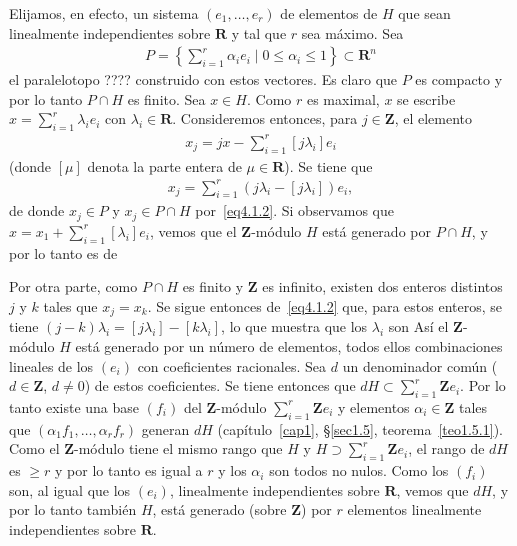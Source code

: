 \documentclass[bibtotoc,leqno,spanish]{amsbook}
\let\emph\relax %
\newcommand{\RR}{\mathbf{R}}
\newcommand{\ZZ}{\mathbf{Z}}
\numberwithin{equation}{section}
\theoremstyle{note}
\theoremstyle{note}
\theoremstyle{rem}
\numberwithin{theorem}{section}
\numberwithin{proposition}{section}
\numberwithin{definition}{section}
\numberwithin{lemma}{section}
\numberwithin{corollary}{section}
\numberwithin{example}{section}
\numberwithin{footnote}{section}%
\begin{document}
Elijamos, en efecto, un sistema $(e_{1},\dots,e_{r})$ de elementos de $H$ que sean linealmente independientes
sobre $\RR$ y tal que $r$ sea m\'aximo. Sea
\begin{gather}
P = \left\{\sum_{i=1}^{r}\alpha_{i}e_{i}\mid 0\leq\alpha_{i}\leq 1\right\}\subset\RR^{n}
\end{gather}
el paralelotopo ???? construido con estos vectores. Es claro que $P$ es compacto y por lo tanto
$P\cap H$ es finito. Sea $x\in H$. Como $r$ es maximal, $x$ se escribe $x = \sum_{i=1}^{r}\lambda_{i}e_{i}$
con $\lambda_{i}\in\RR$. Consideremos entonces, para $j\in\ZZ$, el elemento
\begin{gather}\label{eq4.1.2}
x_{j} = jx-\sum_{i=1}^{r}[j\lambda_{i}]e_{i}
\end{gather}
(donde $[\mu]$ denota la parte entera de $\mu\in\RR$). Se tiene que
\begin{gather*}
x_{j} = \sum_{i=1}^{r}(j\lambda_{i}-[j\lambda_{i}])e_{i},
\end{gather*}
de donde $x_{j}\in P$ y $x_{j}\in P\cap H$ por~\eqref{eq4.1.2}. Si observamos que $x = x_{1}+\sum_{i=1}^{r}[\lambda_{i}]e_{i}$,
vemos que el $\ZZ$-m\'odulo $H$ est\'a generado por $P\cap H$, y por lo tanto es de \emph{tipo finito.}

Por otra parte, como $P\cap H$ es finito y $\ZZ$ es infinito, existen dos enteros distintos $j$ y $k$
tales que $x_{j} = x_{k}$. Se sigue entonces de~\eqref{eq4.1.2} que, para estos enteros, se tiene
$(j-k)\lambda_{i} = [j\lambda_{i}]-[k\lambda_{i}]$, lo que muestra que los $\lambda_{i}$ son
\emph{racionales.} As\'i el $\ZZ$-m\'odulo $H$ est\'a generado por un
n\'umero \emph{finito} de elementos,
todos ellos combinaciones lineales de los $(e_{i})$ con coeficientes racionales.
Sea $d$ un denominador
com\'un ($d\in\ZZ$, $d\neq 0$) de estos coeficientes. Se tiene entonces
que $dH\subset\sum_{i=1}^{r}\ZZ e_{i}$.
Por lo tanto existe una base $(f_{i})$ del $\ZZ$-m\'odulo $\sum_{i=1}^{r}\ZZ e_{i}$ y elementos
$\alpha_{i}\in\ZZ$ tales que $(\alpha_{1}f_{1},\dots,\alpha_{r}f_{r})$ generan $dH$
(cap\'itulo~\ref{cap1}, \S\ref{sec1.5}, teorema~\ref{teo1.5.1}).
Como el $\ZZ$-m\'odulo tiene el mismo rango que $H$ y $H\supset\sum_{i=1}^{r}\ZZ e_{i}$,
el rango de
$dH$ es $\geq r$ y por lo tanto es igual a $r$ y los $\alpha_{i}$ son todos no nulos.
Como los $(f_{i})$
son, al igual que los $(e_{i})$, linealmente independientes sobre $\RR$, vemos que $dH$,
y por lo tanto
tambi\'en $H$, est\'a generado (sobre $\ZZ$) por $r$ elementos linealmente independientes
sobre $\RR$.
\end{document}
